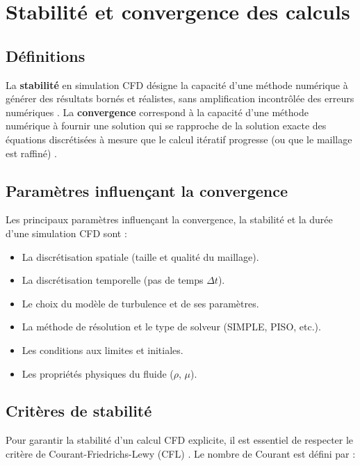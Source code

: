 \section{Stabilité et convergence des calculs}
\label{sec:stabilite_convergence}

\subsection{Définitions}
\label{subsec:definitions}

La \textbf{stabilité} en simulation CFD désigne la capacité d'une méthode numérique à générer des résultats bornés et réalistes, sans amplification incontrôlée des erreurs numériques \cite{courant1928uber}. La \textbf{convergence} correspond à la capacité d'une méthode numérique à fournir une solution qui se rapproche de la solution exacte des équations discrétisées à mesure que le calcul itératif progresse (ou que le maillage est raffiné) \cite{ferziger2002computational}.

\subsection{Paramètres influençant la convergence}
\label{subsec:parametres_convergence}

Les principaux paramètres influençant la convergence, la stabilité et la durée d'une simulation CFD sont \cite{hirsch2007numerical} :
\begin{itemize}
    \item La discrétisation spatiale (taille et qualité du maillage).
    \item La discrétisation temporelle (pas de temps $\Delta t$).
    \item Le choix du modèle de turbulence et de ses paramètres.
    \item La méthode de résolution et le type de solveur (SIMPLE, PISO, etc.).
    \item Les conditions aux limites et initiales.
    \item Les propriétés physiques du fluide ($\rho$, $\mu$).
\end{itemize}

\subsection{Critères de stabilité}
\label{subsec:criteres_stabilite}

Pour garantir la stabilité d'un calcul CFD explicite, il est essentiel de respecter le critère de Courant-Friedrichs-Lewy (CFL) \cite{leveque2007finite}. Le nombre de Courant est défini par :

